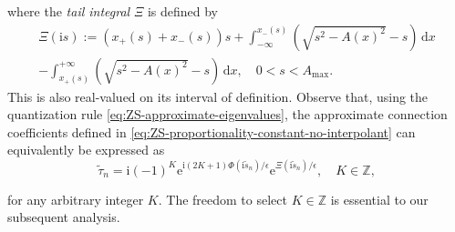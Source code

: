 \documentclass[12pt]{amsart}
\numberwithin{equation}{section}
\newcommand{\dd}{\mathrm{d}}
\newcommand{\ee}{\mathrm{e}}
\newcommand{\ii}{\mathrm{i}}
\newcommand{\phaseint}{\Phi}
\newcommand{\tailint}{\Xi}
\begin{document}
\begin{itemize}
where the \emph{tail integral} $\tailint$ is defined by
\begin{multline}
\tailint(\ii s):=(x_+(s)+x_-(s))s + \int_{-\infty}^{x_-(s)}\left(\sqrt{s^2-A(x)^2}-s\right)\,\dd x \\
   - \int_{x_+(s)}^{+\infty}\left(\sqrt{s^2-A(x)^2}-s\right)\,\dd x,\quad 0<s<A_\mathrm{max}.
\label{eq:mu-define}
\end{multline}
This is also real-valued on its interval of definition.  Observe that, using the quantization rule \eqref{eq:ZS-approximate-eigenvalues}, the approximate connection coefficients defined in \eqref{eq:ZS-proportionality-constant-no-interpolant} can equivalently be expressed as
\begin{equation}
\widetilde{\tau}_n= \ii(-1)^K\ee^{\ii(2K+1)\phaseint(\ii\widetilde{s}_{n})/\epsilon}\ee^{\tailint(\ii\widetilde{s}_{n})/\epsilon},\quad K\in\mathbb{Z},
\label{eq:ZS-proportionality-constant}
\end{equation}
\end{itemize}
for any arbitrary integer $K$. The freedom to select $K\in\mathbb{Z}$ is essential to our subsequent analysis. 
\end{document}
